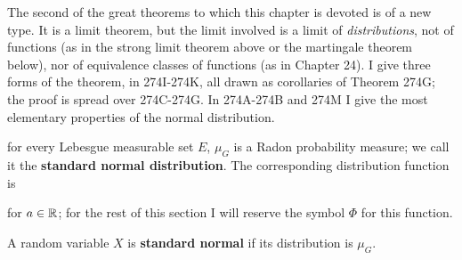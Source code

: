 
\def\chaptername{Probability theory}
\def\sectionname{The central limit theorem}


The second of the great theorems to which this chapter is devoted is of
a new type.   It is a limit theorem, but the limit involved is a limit
of {\it distributions}, not of functions (as in the strong limit theorem
above or the martingale theorem below), nor of equivalence classes of
functions (as in Chapter 24).   I give three forms of the theorem, in
274I-274K, all drawn as corollaries of Theorem 274G;  the proof is
spread over 274C-274G.   In 274A-274B and 274M I give the most
elementary properties of the normal distribution.



\noindent for every Lebesgue measurable set $E$, $\mu_G$ is a Radon
probability measure;  we call it the {\bf standard
normal distribution}.   The corresponding distribution function is


\noindent for $a\in\Bbb R$;  for the rest of this section I will reserve
the symbol $\Phi$ for this function.


 A random variable $X$ is {\bf standard normal}
if its distribution is $\mu_G$.

